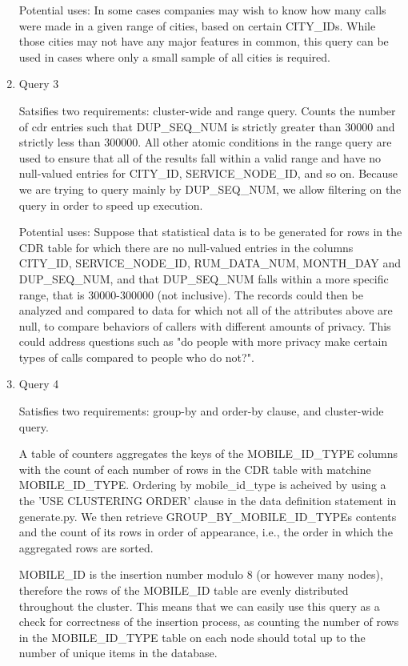 \documentclass[letterpaper]{article}
\begin{document}
\begin{enumerate}
		Potential uses: In some cases companies may wish to know how many calls were made
		in a given range of cities, based on certain CITY\_IDs. While
		those cities may not have any major features in common, this
		query can be used in cases where only a small
		sample of all cities is required.

	\item Query 3
		

		Satsifies two requirements: cluster-wide and range query. Counts the number of cdr
		entries such that DUP\_SEQ\_NUM is strictly greater than 30000 and strictly less than
		300000. All other atomic conditions in the range query are used to ensure that
		all of the results fall within a valid range and have no null-valued entries for
		CITY\_ID, SERVICE\_NODE\_ID, and so on. Because we are trying to query mainly by 
		DUP\_SEQ\_NUM, we allow filtering on the query in order to speed up execution.

		Potential uses: Suppose that statistical data is to be generated for rows in the
		CDR table for which there are no null-valued entries in the columns CITY\_ID,
		SERVICE\_NODE\_ID, RUM\_DATA\_NUM, MONTH\_DAY and DUP\_SEQ\_NUM, and that DUP\_SEQ\_NUM
		falls within a more specific range, that is 30000-300000 (not inclusive). The
		records could then be analyzed and compared to data for which not all of the
		attributes above are null, to compare behaviors of callers with different amounts
		of privacy. This could address questions such as "do people with more privacy make
		certain types of calls compared to people who do not?".

	\item Query 4
		

		Satisfies two requirements: group-by and order-by clause, and cluster-wide query.

		A table of counters aggregates the keys of the MOBILE\_ID\_TYPE columns with the 
		count of each number of rows in the CDR table with matchine MOBILE\_ID\_TYPE.
		Ordering by mobile\_id\_type is acheived by using a the 'USE CLUSTERING ORDER' 
		clause in the data definition statement in generate.py.
		We then retrieve GROUP\_BY\_MOBILE\_ID\_TYPEs contents and the count of its rows
		in order of appearance, i.e., the order in which the aggregated rows are sorted.

		MOBILE\_ID is the insertion number modulo 8 (or however many nodes), therefore
		the rows of the MOBILE\_ID table are evenly distributed throughout the cluster.
		This means that we can easily use this query as a check for correctness of
		the insertion process, as counting the number of rows in the MOBILE\_ID\_TYPE table
		on each node should total up to the number of unique items in the database.


\end{enumerate}
\end{document}
